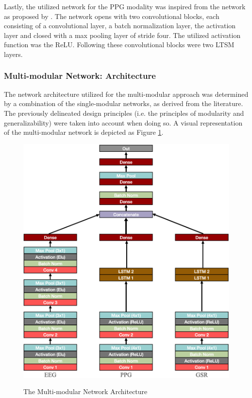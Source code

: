 \documentclass[12pt]{article}
\begin{document}
Lastly, the utilized network for the PPG modality was inspired from the network as proposed by . The network opens with two convolutional blocks, each consisting of a convolutional layer, a batch normalization layer, the activation layer and closed with a max pooling layer of stride four. The utilized activation function was the ReLU. Following these convolutional blocks were two LTSM layers.

\subsubsection{Multi-modular Network: Architecture}
The network architecture utilized for the multi-modular approach was determined by a combination of the single-modular networks, as derived from the literature. The previously delineated design principles (i.e. the principles of modularity and generalizability) were taken into account when doing so. A visual representation of the multi-modular network is depicted as Figure \ref{fig:multiarchitecture}.

\begin{figure}
\caption{The Multi-modular Network Architecture}
\bigskip
\includegraphics[scale=0.725]{multi_model_architecture}
\label{fig:multiarchitecture}
\end{figure}
\end{document}
